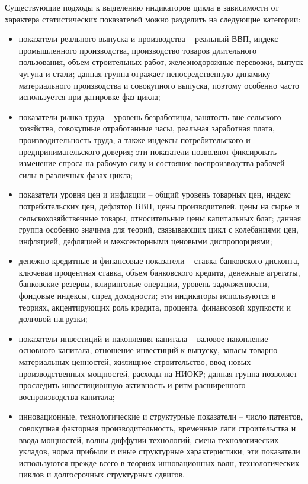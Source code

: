 Существующие подходы к выделению индикаторов цикла в зависимости от характера статистических показателей можно разделить на следующие категории:
\begin{itemize}
    \item показатели реального выпуска и производства – реальный ВВП, индекс промышленного производства, производство товаров длительного пользования, объем строительных работ, железнодорожные перевозки, выпуск чугуна и стали; данная группа отражает непосредственную динамику материального производства и совокупного выпуска, поэтому особенно часто используется при датировке фаз цикла;
    \item показатели рынка труда – уровень безработицы, занятость вне сельского хозяйства, совокупные отработанные часы, реальная заработная плата, производительность труда, а также индексы потребительского и предпринимательского доверия; эти показатели позволяют фиксировать изменение спроса на рабочую силу и состояние воспроизводства рабочей силы в различных фазах цикла;
    \item показатели уровня цен и инфляции – общий уровень товарных цен, индекс потребительских цен, дефлятор ВВП, цены производителей, цены на сырье и сельскохозяйственные товары, относительные цены капитальных благ; данная группа особенно значима для теорий, связывающих цикл с колебаниями цен, инфляцией, дефляцией и межсекторными ценовыми диспропорциями;
    \item денежно-кредитные и финансовые показатели – ставка банковского дисконта, ключевая процентная ставка, объем банковского кредита, денежные агрегаты, банковские резервы, клиринговые операции, уровень задолженности, фондовые индексы, спред доходности; эти индикаторы используются в теориях, акцентирующих роль кредита, процента, финансовой хрупкости и долговой нагрузки;
    \item показатели инвестиций и накопления капитала – валовое накопление основного капитала, отношение инвестиций к выпуску, запасы товарно-материальных ценностей, жилищное строительство, ввод новых производственных мощностей, расходы на НИОКР; данная группа позволяет проследить инвестиционную активность и ритм расширенного воспроизводства капитала;
    \item инновационные, технологические и структурные показатели – число патентов, совокупная факторная производительность, временные лаги строительства и ввода мощностей, волны диффузии технологий, смена технологических укладов, норма прибыли и иные структурные характеристики; эти показатели используются прежде всего в теориях инновационных волн, технологических циклов и долгосрочных структурных сдвигов.
\end{itemize}

